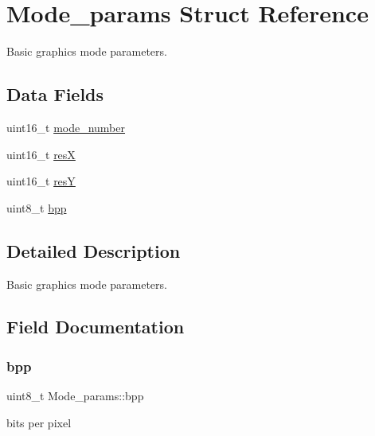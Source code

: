\hypertarget{structMode__params}{}\section{Mode\+\_\+params Struct Reference}
\label{structMode__params}


Basic graphic\textquotesingle{}s mode parameters.  


\subsection*{Data Fields}
\begin{DoxyCompactItemize}
\item 
uint16\+\_\+t \mbox{\hyperlink{structMode__params_a54acbcb3e6c50ce8426203e9610aebd4}{mode\+\_\+number}}
\item 
uint16\+\_\+t \mbox{\hyperlink{structMode__params_a92630f451a6b0a91386ac35951ee29d8}{resX}}
\item 
uint16\+\_\+t \mbox{\hyperlink{structMode__params_abd4d48099c3f3504a83c4837cf1bd8ff}{resY}}
\item 
uint8\+\_\+t \mbox{\hyperlink{structMode__params_a566a8b9cae88efe257ff5a023d17c1c8}{bpp}}
\end{DoxyCompactItemize}


\subsection{Detailed Description}
Basic graphic\textquotesingle{}s mode parameters. 

\subsection{Field Documentation}
\mbox{\label{structMode__params_a566a8b9cae88efe257ff5a023d17c1c8}} 
\subsubsection{\texorpdfstring{bpp}{bpp}}
{\footnotesize\ttfamily uint8\+\_\+t Mode\+\_\+params\+::bpp}

bits per pixel \mbox{\label{structMode__params_a54acbcb3e6c50ce8426203e9610aebd4}} 
